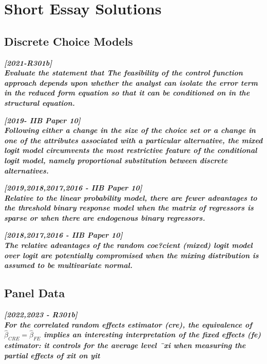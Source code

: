 \documentclass[DIV=14,titlepage=false]{scrreprt}
\begin{document}
\vspace{-10pt}

\chapter*{Short Essay Solutions}

\section*{Discrete Choice Models}

\textbf{\textit{[2021-R301b]\\
 Evaluate the statement that The feasibility of the control function approach depends upon whether the analyst can isolate the error term in the reduced form equation so that it can be conditioned on in the structural equation.}}

\vspace{5pt}

\textbf{\textit{[2019- IIB Paper 10] \\
 Following either a change in the size of the choice set or a change in one of the attributes associated with a particular alternative, the mixed logit model circumvents the most restrictive feature of the conditional logit model, namely proportional substitution between discrete alternatives.}}

\vspace{5pt}

\textbf{\textit{[2019,2018,2017,2016 - IIB Paper 10] \\ 
Relative to the linear probability model, there are fewer advantages to the threshold binary response model when the matrix of regressors is sparse or when there are endogenous binary regressors.}}

\vspace{5pt}

\textbf{\textit{[2018,2017,2016 - IIB Paper 10] \\ 
The relative advantages of the random coe?cient (mixed) logit model over logit are potentially compromised when the mixing distribution is assumed to be multivariate normal.}}

\section*{Panel Data}

\textbf{\textit{[2022,2023 - R301b] \\
For the correlated random effects estimator (cre), the equivalence of $\hat \beta_{CRE} = \hat \beta_{FE}$ implies an interesting interpretation of the fixed effects (fe) estimator: it controls for the average level ¯xi when measuring the partial effects of xit on yit}}
\end{document}

